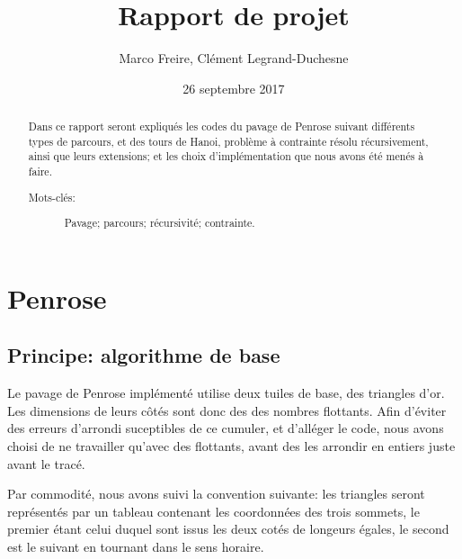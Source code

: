 \documentclass[a4paper, 11pt]{article}%
\begin{document}
\title{Rapport de projet}

\author{Marco Freire, Clément Legrand-Duchesne}

\date{26 septembre 2017}

\maketitle

\begin{abstract}
  Dans ce rapport seront expliqués les codes du pavage de Penrose
  suivant différents types de parcours, et des tours de Hanoi, problème
  à contrainte résolu récursivement, ainsi que leurs extensions; et les
  choix d'implémentation que nous avons été menés à faire.
  \begin{description}
    
  \item[Mots-clés:] Pavage; parcours; récursivité; contrainte.

   

  \end{description}
\end{abstract}


\section{Penrose}
        \subsection{Principe: algorithme de base}
                Le pavage de Penrose implémenté utilise deux tuiles de
                base, des triangles d'or. Les dimensions de leurs
                côtés sont donc des des nombres flottants. Afin
                d'éviter des erreurs d'arrondi suceptibles de ce
                cumuler, et d'alléger le code, nous avons choisi de ne
                travailler qu'avec des flottants, avant des les
                arrondir en entiers juste avant le tracé.
                
                Par commodité, nous avons suivi la convention
                suivante: les triangles seront représentés par un
                tableau contenant les coordonnées des trois sommets,
                le premier étant celui duquel sont issus les deux
                cotés de longeurs égales, le second est le suivant en
                tournant dans le sens horaire.
\end{document}
